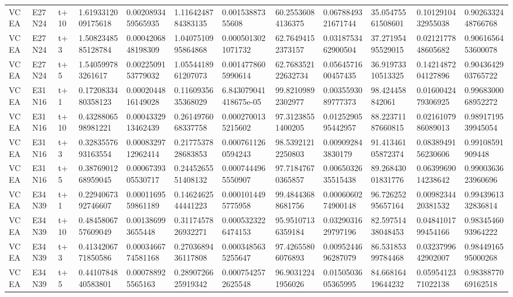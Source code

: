 \begin{landscape}
\begin{longtable}{llllllllllll}
VCEA & E27N24 & t+10 & 1.6193312009175618 & 0.0020893459565935 & 1.1164248784383135 & 0.00153887355608 & 60.25536084136375 & 0.0678849321671744 & 35.05475561508601 & 0.1012910432955038 & 0.9026332448766768 \\
VCEA & E27N24 & t+3 & 1.5082348585128784 & 0.0004206848198309 & 1.0407510995864868 & 0.0005013021071732 & 62.76494152373157 & 0.0318753462900504 & 37.27195495529015 & 0.0212177848605682 & 0.9061656453600078 \\
VCEA & E27N24 & t+5 & 1.540599783261617 & 0.0022509153779032 & 1.0554418961207073 & 0.0014778605990614 & 62.768352122632734 & 0.0564571600457435 & 36.91973310513325 & 0.1421487204127896 & 0.9043642903765722 \\
VCEA & E31N16 & t+1 & 0.1720833480358123 & 0.0002044816149028 & 0.1160935635368029 & 6.843079041418675e-05 & 99.82109892302977 & 0.0035593089777373 & 98.424458842061 & 0.0160042479306925 & 0.9968300068952272 \\
VCEA & E31N16 & t+10 & 0.4328806598981221 & 0.0004332913462439 & 0.2614976068337758 & 0.0002700135215602 & 97.31238551400205 & 0.0125290595442957 & 88.22371187660815 & 0.0216107986089013 & 0.9891719539945054 \\
VCEA & E31N16 & t+3 & 0.3283557693163554 & 0.0008329712962414 & 0.2177537828683853 & 0.0007611260594243 & 98.53921212250803 & 0.009092843830179 & 91.41346105872374 & 0.0838949156230606 & 0.99108591909448 \\
VCEA & E31N16 & t+5 & 0.3876901268959045 & 0.0006739305530717 & 0.2445265551408132 & 0.0007444965550907 & 97.71847670365857 & 0.0065032635515438 & 89.26843001831776 & 0.0639969014238642 & 0.9900363623960696 \\
VCEA & E34N39 & t+1 & 0.2294067392746607 & 0.0001169559861189 & 0.1462462544441223 & 0.0001014495775958 & 99.48443688681756 & 0.0006060274900148 & 96.72625295657164 & 0.0098234420381532 & 0.9943961332836814 \\
VCEA & E34N39 & t+10 & 0.4845806757609049 & 0.001386993655448 & 0.3117457826932271 & 0.0005323226474153 & 95.95107136359184 & 0.0329031629797196 & 82.59751438048453 & 0.0484101799454166 & 0.9834546093964222 \\
VCEA & E34N39 & t+3 & 0.4134206771850586 & 0.0003466774581168 & 0.2703689436117808 & 0.0003485635255647 & 97.42655806076893 & 0.0095244696287079 & 86.53185399784468 & 0.0323799642902007 & 0.9844916595000268 \\
VCEA & E34N39 & t+5 & 0.4410784840583801 & 0.000788925565163 & 0.2890726625919342 & 0.0007542572625548 & 96.90312241956026 & 0.0150503605365995 & 84.66816419644232 & 0.0595412371022138 & 0.9838877069162518 \\

\end{longtable}
\end{landscape}
